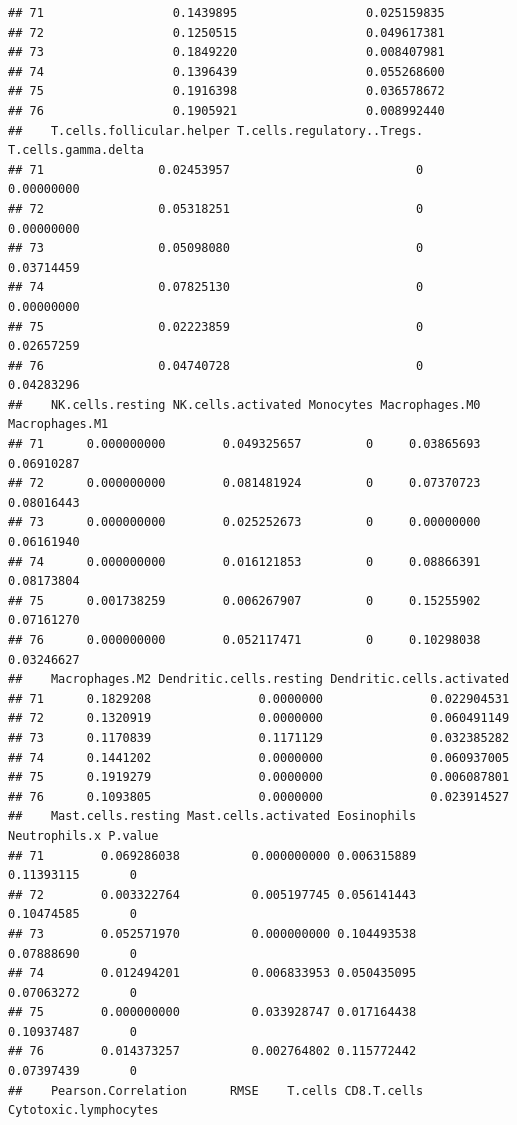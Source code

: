 \documentclass[
  12pt,
]{book}
\begin{document}
\begin{verbatim}
## 71                  0.1439895                  0.025159835
## 72                  0.1250515                  0.049617381
## 73                  0.1849220                  0.008407981
## 74                  0.1396439                  0.055268600
## 75                  0.1916398                  0.036578672
## 76                  0.1905921                  0.008992440
##    T.cells.follicular.helper T.cells.regulatory..Tregs. T.cells.gamma.delta
## 71                0.02453957                          0          0.00000000
## 72                0.05318251                          0          0.00000000
## 73                0.05098080                          0          0.03714459
## 74                0.07825130                          0          0.00000000
## 75                0.02223859                          0          0.02657259
## 76                0.04740728                          0          0.04283296
##    NK.cells.resting NK.cells.activated Monocytes Macrophages.M0 Macrophages.M1
## 71      0.000000000        0.049325657         0     0.03865693     0.06910287
## 72      0.000000000        0.081481924         0     0.07370723     0.08016443
## 73      0.000000000        0.025252673         0     0.00000000     0.06161940
## 74      0.000000000        0.016121853         0     0.08866391     0.08173804
## 75      0.001738259        0.006267907         0     0.15255902     0.07161270
## 76      0.000000000        0.052117471         0     0.10298038     0.03246627
##    Macrophages.M2 Dendritic.cells.resting Dendritic.cells.activated
## 71      0.1829208               0.0000000               0.022904531
## 72      0.1320919               0.0000000               0.060491149
## 73      0.1170839               0.1171129               0.032385282
## 74      0.1441202               0.0000000               0.060937005
## 75      0.1919279               0.0000000               0.006087801
## 76      0.1093805               0.0000000               0.023914527
##    Mast.cells.resting Mast.cells.activated Eosinophils Neutrophils.x P.value
## 71        0.069286038          0.000000000 0.006315889    0.11393115       0
## 72        0.003322764          0.005197745 0.056141443    0.10474585       0
## 73        0.052571970          0.000000000 0.104493538    0.07888690       0
## 74        0.012494201          0.006833953 0.050435095    0.07063272       0
## 75        0.000000000          0.033928747 0.017164438    0.10937487       0
## 76        0.014373257          0.002764802 0.115772442    0.07397439       0
##    Pearson.Correlation      RMSE    T.cells CD8.T.cells Cytotoxic.lymphocytes

\end{verbatim}
\end{document}
